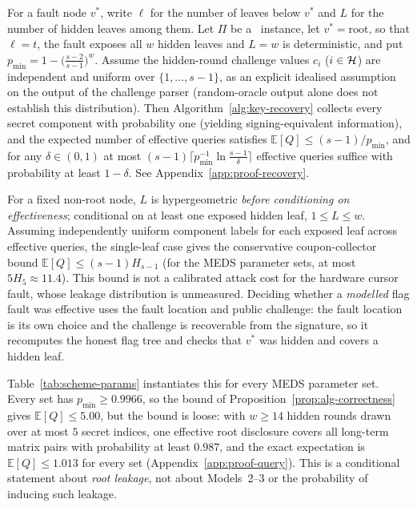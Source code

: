 \begin{proposition}
\label{prop:alg-correctness}
For a fault node $v^*$, write $\ell$ for the number of leaves below $v^*$ and
$L$ for the number of hidden leaves among them. Let $\Pi$ be a \GZKST\
instance, let $v^* = \mathrm{root}$, so that $\ell = t$, the fault exposes all
$w$ hidden leaves and $L = w$ is deterministic, and put
$p_{\min} = 1 - \bigl(\tfrac{s-2}{s-1}\bigr)^{w}$. Assume the
hidden-round challenge values $c_i$ ($i \in \mathcal{H}$) are independent and uniform
over $\{1,\ldots,s-1\}$, as an explicit idealised assumption on the output of the challenge parser (random-oracle output alone does not establish this distribution).
Then Algorithm~\ref{alg:key-recovery} collects every secret component
with probability one (yielding signing-equivalent information), and the
expected number of effective queries satisfies
$\mathbb{E}[Q] \leq (s-1)/p_{\min}$, and for any $\delta \in (0,1)$ at most
$(s-1)\bigl\lceil p_{\min}^{-1} \ln \frac{s-1}{\delta} \bigr\rceil$
effective queries suffice with probability at least $1-\delta$. See
Appendix~\ref{app:proof-recovery}.
\end{proposition}

For a fixed non-root node, $L$ is hypergeometric \emph{before conditioning
on effectiveness}; conditional on at least one exposed hidden leaf,
$1\leq L\leq w$. Assuming independently uniform component labels for
each exposed leaf across effective queries, the single-leaf case gives the
conservative coupon-collector bound $\mathbb{E}[Q]\leq(s-1)H_{s-1}$
(for the MEDS parameter sets, at most $5H_5\approx11.4$). This bound
is not a calibrated attack cost for the hardware cursor fault, whose
leakage distribution is unmeasured. Deciding whether a \emph{modelled}
flag fault was effective uses the fault location and public challenge: the fault location
is its own choice and the challenge is recoverable from the signature, so it
recomputes the honest flag tree and checks that $v^*$ was hidden and covers a
hidden leaf.

Table~\ref{tab:scheme-params} instantiates this for every MEDS parameter
set. Every set has $p_{\min} \geq 0.9966$, so the bound of
Proposition~\ref{prop:alg-correctness} gives $\mathbb{E}[Q] \leq 5.00$, but
the bound is loose: with $w \geq 14$ hidden rounds drawn over at most $5$
secret indices, one effective root disclosure covers all long-term matrix pairs with
probability at least $0.987$, and the exact expectation is
$\mathbb{E}[Q] \leq 1.013$ for every set (Appendix~\ref{app:proof-query}).
This is a conditional statement about \emph{root leakage}, not about
Models~2--3 or the probability of inducing such leakage.

